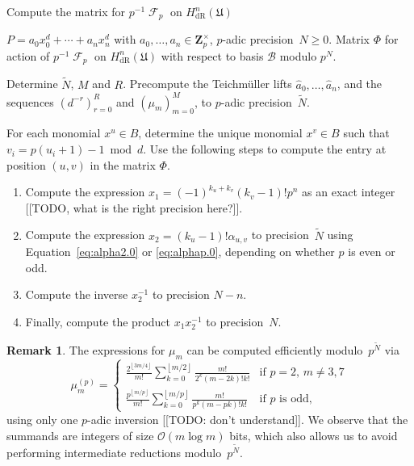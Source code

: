 \documentclass[a4paper,11pt]{article}
\numberwithin{equation}{section}
\providecommand{\floor}[1]{\left\lfloor#1\right\rfloor}   %
\newcommand{\ZZ}{\mathbf{Z}} %
\DeclareMathOperator{\Frob}{\mathcal{F}} %
\providecommand{\HdR}{H_{\text{dR}}}    %
\providecommand{\cB}{\mathcal{B}} %
\providecommand{\BigOh}{\mathcal{O}} %
\theoremstyle{definition}
\newtheorem{rem}[thm]{Remark}
\begin{document}
\begin{algorithm}
\caption{Compute the matrix for $p^{-1} \Frob_p$ on $\HdR^n(\mathfrak{U})$}
\label{alg:Diabfrob}
\begin{algorithmic}
\vspace{1mm}
\Require $P=a_0 x_0^d + \dotsb + a_n x_n^d$ 
         with $a_0,\dotsc,a_n \in \ZZ_p^{\times}$, 
         $p$-adic precision~$N \geq 0$.
\Ensure  Matrix $\Phi$ for action of $p^{-1} \Frob_p$ on $\HdR^n(\mathfrak{U})$ with respect to basis $\cB$ modulo $p^N$.
\State \begin{compactenum}[\it {Step} I.] \vspace{-1.24em}
\item Determine $\tilde{N}$, $M$ and $R$. Precompute the Teichm\"uller lifts $\hat{a}_0, \dotsc, \hat{a}_n$, 
      and the sequences $(d^{-r})_{r=0}^R$ and $(\mu_m)_{m=0}^{M}$, 
      to $p$-adic precision~$\tilde{N}$.
\item For each monomial $x^u \in B$, 
      determine the unique monomial $x^v \in B$ such that 
      $v_i = p (u_i + 1) - 1 \bmod{d}$.  Use the following steps to 
      compute the entry at position $(u,v)$ in the matrix $\Phi$.
      \begin{enumerate}
\item Compute the expression $x_1 = (-1)^{k_u+k_v} (k_v-1)! p^n$ as an 
      exact integer [[TODO, what is the right precision here?]].
\item Compute the expression $x_2 = (k_u - 1)! \alpha_{u,v}$ to 
      precision~$\tilde{N}$ using Equation~\eqref{eq:alpha2.0} or 
      \eqref{eq:alphap.0}, depending on whether $p$ is even or odd. 
\item Compute the inverse $x_2^{-1}$ to precision $N - n$.
\item Finally, compute the product $x_1 x_2^{-1}$ to precision~$N$.
      \end{enumerate}
\end{compactenum}
\EndProcedure
\end{algorithmic}
\end{algorithm}


\begin{rem} \label{rem:mup}
The expressions for $\mu_m$ can be computed efficiently 
modulo~$p^{\tilde{N}}$ via 
\begin{equation}
\mu_m^{(p)} = \begin{cases}
\frac{2^{\floor{3m/4}}}{m!} 
    \sum_{k=0}^{\floor{m/2}} \frac{m!}{2^k (m-2k)! k!}
    & \text{if $p = 2$, $m \neq 3, 7$} \\
\frac{p^{\floor{m/p}}}{m!} 
    \sum_{k=0}^{\floor{m/p}} \frac{m!}{p^k (m-pk)! k!}
    & \text{if $p$ is odd},
\end{cases}
\end{equation}
using only one $p$-adic inversion [[TODO: don't understand]].  
We observe that the summands are integers of size $\BigOh(m \log m)$ bits, 
which also allows us to avoid performing intermediate reductions 
modulo~$p^{\tilde{N}}$.
\end{rem}
\end{document}
